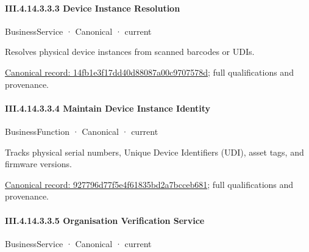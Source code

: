 \paragraph*{III.4.14.3.3.3 Device Instance Resolution}
\label{navigation:III.4.14.3.3.3}

\label{element:14fb1e3f17dd40d88087a00c9707578d}
{\small BusinessService · Canonical · current}\par

Resolves physical device instances from scanned barcodes or UDIs.


{\footnotesize \href{../../../../../../../../continuum/business/business-service/14fb1e3f17dd40d88087a00c9707578d.md}{Canonical record: 14fb1e3f17dd40d88087a00c9707578d}; full qualifications and provenance.}\par
\paragraph*{III.4.14.3.3.4 Maintain Device Instance Identity}
\label{navigation:III.4.14.3.3.4}

\label{element:927796d77f5e4f61835bd2a7bcceb681}
{\small BusinessFunction · Canonical · current}\par

Tracks physical serial numbers, Unique Device Identifiers (UDI), asset tags, and firmware versions.


{\footnotesize \href{../../../../../../../../continuum/business/business-function/927796d77f5e4f61835bd2a7bcceb681.md}{Canonical record: 927796d77f5e4f61835bd2a7bcceb681}; full qualifications and provenance.}\par
\paragraph*{III.4.14.3.3.5 Organisation Verification Service}
\label{navigation:III.4.14.3.3.5}

\label{element:223b2cbe762b40efb9f05bb5cdd66bcb}
{\small BusinessService · Canonical · current}\par

